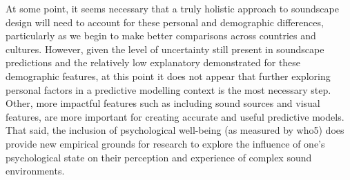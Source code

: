 At some point, it seems necessary that a truly holistic approach to soundscape design will need to account for these personal and demographic differences, particularly as we begin to make better comparisons across countries and cultures. However, given the level of uncertainty still present in soundscape predictions and the relatively low explanatory demonstrated for these demographic features, at this point it does not appear that further exploring personal factors in a predictive modelling context is the most necessary step. Other, more impactful features such as including sound sources and visual features, are more important for creating accurate and useful predictive models. That said, the inclusion of psychological well-being (as measured by \gls{who5}) does provide new empirical grounds for research to explore the influence of one's psychological state on their perception and experience of complex sound environments.
